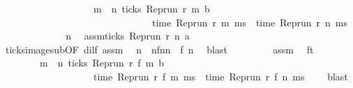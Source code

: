 \begin{isabellebody}
\ \ \ \ \ \ \ \ \ \ \ \ \ \ \ \ \ \ {\isasymlongrightarrow}\ {\isacharparenleft}{\isasymexists}m\ {\isasymge}\ n{\isachardot}\ ticks\ {\isacharparenleft}{\isacharparenleft}Rep{\isacharunderscore}run\ r{\isacharparenright}\ m\ b{\isacharparenright}\isanewline
\ \ \ \ \ \ \ \ \ \ \ \ \ \ \ \ \ \ \ \ \ \ \ \ \ \ \ \ \ {\isasymand}\ \ time\ {\isacharparenleft}{\isacharparenleft}Rep{\isacharunderscore}run\ r{\isacharparenright}\ m\ ms{\isacharparenright}\ {\isacharequal}\ time\ {\isacharparenleft}{\isacharparenleft}Rep{\isacharunderscore}run\ r{\isacharparenright}\ n\ ms{\isacharparenright}\ {\isacharplus}\ {\isasymdelta}{\isasymtau}{\isacharparenright}{\isacartoucheclose}\isanewline
\ \ \isamarkupfalse%
\ {\isacharminus}\isanewline
\ \ \ \ \isacommand{{\isacharbraceleft}}\isamarkupfalse%
\ \isamarkupfalse%
\ n\ \isamarkupfalse%
\ assm{\isacharcolon}{\isacartoucheopen}ticks\ {\isacharparenleft}{\isacharparenleft}Rep{\isacharunderscore}run\ r{\isacharparenright}\ n\ a{\isacharparenright}{\isacartoucheclose}\isanewline
\ \ \ \ \ \ \isamarkupfalse%
\ ticks{\isacharunderscore}image{\isacharunderscore}sub{\isacharbrackleft}OF\ dilf\ assm{\isacharbrackright}\ \isamarkupfalse%
\ n\ \ nfn{}{\isacharcolon}{\isacartoucheopen}n\ {\isacharequal}\ f\ n\ \isamarkupfalse%
\ blast\isanewline
\ \ \ \ \ \ \isamarkupfalse%
\ {\isacharasterisk}{\isacharasterisk}\ assm\ \isamarkupfalse%
\ ft{}{\isacharcolon}\isanewline
\ \ \ \ \ \ \ \ {\isacartoucheopen}{\isacharparenleft}{\isasymexists}m\ {\isasymge}\ n\ ticks\ {\isacharparenleft}{\isacharparenleft}Rep{\isacharunderscore}run\ r{\isacharparenright}\ {\isacharparenleft}f\ m\ b{\isacharparenright}\isanewline
\ \ \ \ \ \ \ \ \ \ \ \ \ \ \ \ \ \ {\isasymand}\ time\ {\isacharparenleft}{\isacharparenleft}Rep{\isacharunderscore}run\ r{\isacharparenright}\ {\isacharparenleft}f\ m\ ms{\isacharparenright}\ {\isacharequal}\ time\ {\isacharparenleft}{\isacharparenleft}Rep{\isacharunderscore}run\ r{\isacharparenright}\ {\isacharparenleft}f\ n\ ms{\isacharparenright}\ {\isacharplus}\ {\isasymdelta}{\isasymtau}{\isacharparenright}{\isacartoucheclose}\ \isamarkupfalse%
\ blast\isanewline

\end{isabellebody}
